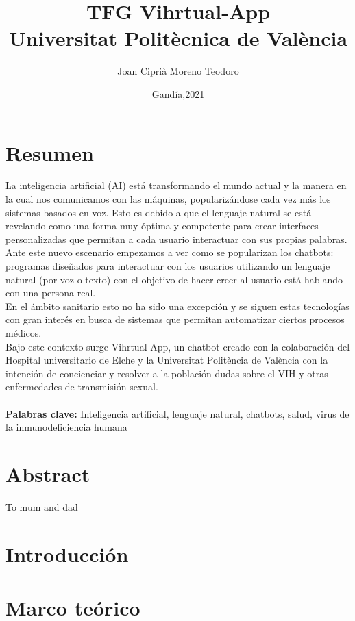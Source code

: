 \documentclass[11pt]{book}
\title{
{TFG Vihrtual-App}\\
{\large Universitat Politècnica de València}\\
}
\author{Joan Ciprià Moreno Teodoro}
\date{Gandía,2021}
\begin{document}
\maketitle

\chapter*{Resumen}
La inteligencia artificial (AI) está transformando el mundo actual y la manera en la cual nos comunicamos con las máquinas, popularizándose cada vez más los sistemas basados en voz. Esto es debido a que el lenguaje natural se está revelando como una forma muy óptima y competente para crear interfaces personalizadas que permitan a cada usuario interactuar con sus propias palabras. \\

Ante este nuevo escenario empezamos a ver como se popularizan los chatbots: programas diseñados para interactuar con los usuarios utilizando un lenguaje natural (por voz o texto) con el objetivo de hacer creer al usuario está hablando con una persona real. \\

En el ámbito sanitario esto no ha sido una excepción y se siguen estas tecnologías con gran interés en busca de sistemas que permitan automatizar ciertos procesos médicos. \\

Bajo este contexto surge Vihrtual-App, un chatbot creado con la colaboración del Hospital universitario de Elche y la Universitat Politència de València con la intención de concienciar y resolver a la población dudas sobre el VIH y otras enfermedades de transmisión sexual.
\\
\\
\textbf{Palabras clave:} Inteligencia artificial, lenguaje natural, chatbots, salud, virus de la inmunodeficiencia humana

\chapter*{Abstract}
To mum and dad

\tableofcontents

\chapter{Introducción}


\chapter{Marco teórico}

\end{document}
